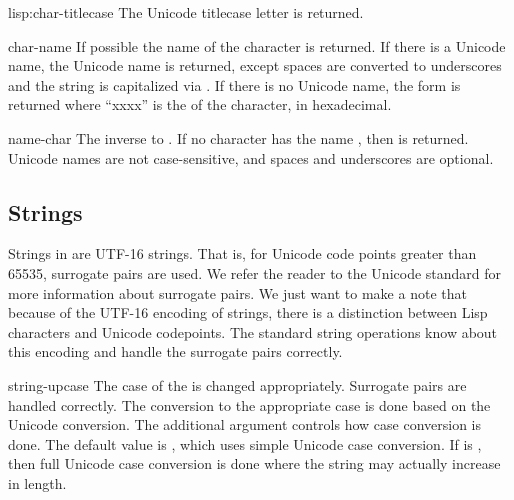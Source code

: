 \begin{defun}{lisp:}{char-titlecase}{\args {}}
  The Unicode titlecase letter is returned.
\end{defun}

\begin{defun}{}{char-name}{\args {}}
   If possible the name of the character  is returned.  If
   there is a Unicode name, the Unicode name is returned, except
   spaces are converted to underscores and the string is capitalized
   via .  If there is no Unicode name, the
   form  is returned where ``xxxx'' is the
    of the character, in hexadecimal.
\end{defun}

\begin{defun}{}{name-char}{\args {}}
  The inverse to .  If no character has the name
  , then \nil{} is returned.  Unicode names are not
  case-sensitive, and spaces and underscores are optional.
\end{defun}
\subsection{Strings}

Strings in \cmucl{} are UTF-16 strings.  That is, for Unicode code
points greater than 65535, surrogate pairs are used.  We refer the
reader to the Unicode standard for more information about surrogate
pairs.  We just want to make a note that because of the UTF-16
encoding of strings, there is a distinction between Lisp characters
and Unicode codepoints.  The standard string operations know about
this encoding and handle the surrogate pairs correctly.


\begin{defun}{}{string-upcase}{\args {} }
  The case of the  is changed appropriately.  Surrogate
  pairs are handled correctly.  The conversion to the appropriate case
  is done based on the Unicode conversion.  The additional argument
   controls how case conversion is done.  The default
  value is , which uses simple Unicode case conversion.
  If  is , then full Unicode case conversion is
  done where the string may actually increase in length.
\end{defun}

